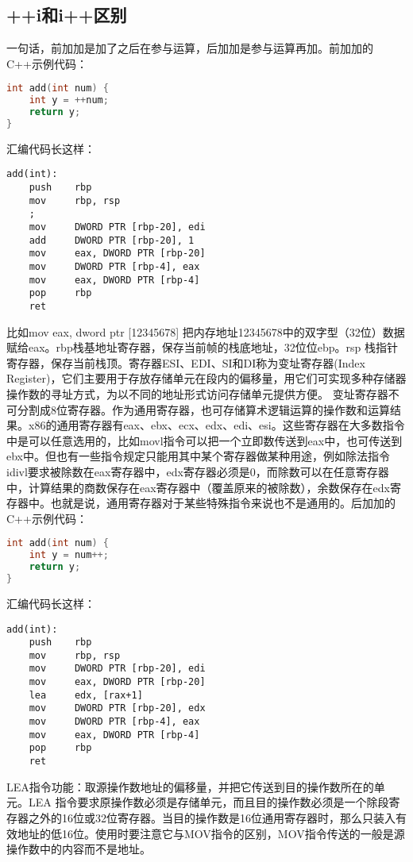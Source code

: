 \documentclass[../../../interview-questions.tex]{subfiles}
\begin{document}
\subsection{++i和i++区别}

一句话，前加加是加了之后在参与运算，后加加是参与运算再加。前加加的C++示例代码：

\begin{lstlisting}[language=C++]
int add(int num) {
    int y = ++num;
    return y;
}
\end{lstlisting}

汇编代码长这样：

\begin{lstlisting}[language={[x86masm]Assembler}]
add(int):
    push    rbp
    mov     rbp, rsp
    ; 
    mov     DWORD PTR [rbp-20], edi
    add     DWORD PTR [rbp-20], 1
    mov     eax, DWORD PTR [rbp-20]
    mov     DWORD PTR [rbp-4], eax
    mov     eax, DWORD PTR [rbp-4]
    pop     rbp
    ret
\end{lstlisting}

比如mov eax, dword ptr [12345678]  把内存地址12345678中的双字型（32位）数据赋给eax。rbp栈基地址寄存器，保存当前帧的栈底地址，32位位ebp。rsp 栈指针寄存器，保存当前栈顶。寄存器ESI、EDI、SI和DI称为变址寄存器(Index Register)，它们主要用于存放存储单元在段内的偏移量，用它们可实现多种存储器操作数的寻址方式，为以不同的地址形式访问存储单元提供方便。
变址寄存器不可分割成8位寄存器。作为通用寄存器，也可存储算术逻辑运算的操作数和运算结果。x86的通用寄存器有eax、ebx、ecx、edx、edi、esi。这些寄存器在大多数指令中是可以任意选用的，比如movl指令可以把一个立即数传送到eax中，也可传送到ebx中。但也有一些指令规定只能用其中某个寄存器做某种用途，例如除法指令idivl要求被除数在eax寄存器中，edx寄存器必须是0，而除数可以在任意寄存器中，计算结果的商数保存在eax寄存器中（覆盖原来的被除数），余数保存在edx寄存器中。也就是说，通用寄存器对于某些特殊指令来说也不是通用的。后加加的C++示例代码：

\begin{lstlisting}[language=C++]
int add(int num) {
    int y = num++;
    return y;
}
\end{lstlisting}

汇编代码长这样：

\begin{lstlisting}[language={[x86masm]Assembler}]
add(int):
    push    rbp
    mov     rbp, rsp
    mov     DWORD PTR [rbp-20], edi
    mov     eax, DWORD PTR [rbp-20]
    lea     edx, [rax+1]
    mov     DWORD PTR [rbp-20], edx
    mov     DWORD PTR [rbp-4], eax
    mov     eax, DWORD PTR [rbp-4]
    pop     rbp
    ret
\end{lstlisting}

LEA指令功能：取源操作数地址的偏移量，并把它传送到目的操作数所在的单元。LEA 指令要求原操作数必须是存储单元，而且目的操作数必须是一个除段寄存器之外的16位或32位寄存器。当目的操作数是16位通用寄存器时，那么只装入有效地址的低16位。使用时要注意它与MOV指令的区别，MOV指令传送的一般是源操作数中的内容而不是地址。
\end{document}
